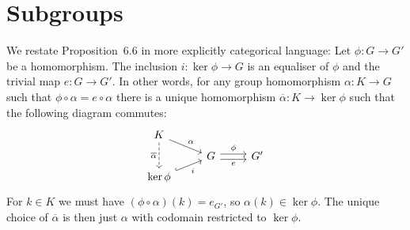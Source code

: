 \documentclass[article, a4paper, 11pt, oneside]{memoir}
\numberwithin{equation}{chapter}
\theoremstyle{nonumberplain}
\begin{document}
\section{Subgroups}

\begin{remark}
    We restate Proposition~6.6 in more explicitly categorical language: Let $\phi \colon G \to G'$ be a homomorphism. The inclusion $i \colon \ker\phi \to G$ is an equaliser of $\phi$ and the trivial map $e \colon G \to G'$. In other words, for any group homomorphism $\alpha \colon K \to G$ such that $\phi \circ \alpha = e \circ \alpha$ there is a unique homomorphism $\overline\alpha \colon K \to \ker\phi$ such that the following diagram commutes:
    \begin{equation*}
        \begin{tikzcd}[row sep=tiny]
            K
                \ar[dr, "\alpha"]
                \ar[dd, "\overline\alpha", swap, dashed]
            \\
            & G
                \ar[r, "\phi", shift left]
                \ar[r, "e", shift right, swap]
            & G'
            \\
            \ker\phi
                \ar[ur, "i", swap, hook]
        \end{tikzcd}
    \end{equation*}
    For $k \in K$ we must have $(\phi \circ \alpha)(k) = e_{G'}$, so $\alpha(k) \in \ker\phi$. The unique choice of $\overline\alpha$ is then just $\alpha$ with codomain restricted to $\ker\phi$.
\end{remark}
\end{document}
